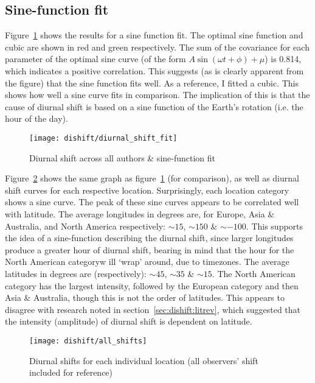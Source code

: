 \subsection{Sine-function fit}
Figure~\ref{fig:dishift:fit} shows the results for a sine function fit. The optimal sine function and cubic are shown in red and green respectively.  The sum of the covariance for each parameter of the optimal sine curve (of the form $A \sin \left( \omega t + \phi \right) + \mu$) is 0.814, which indicates a positive correlation. This suggests (as is clearly apparent from the figure) that the sine function fits well. As a reference, I fitted a cubic. This shows how well a sine curve fits in comparison. The implication of this is that the cause of diurnal shift is based on a sine function of the Earth's rotation (i.e. the hour of the day).

\begin{figure}[h!]
	\centering
	\texttt{[image: dishift/diurnal\_shift\_fit]}
	\caption{Diurnal shift across all authors \& sine-function fit
		\label{fig:dishift:fit}}
\end{figure}

Figure~\ref{fig:dishift:all} shows the same graph as figure~\ref{fig:dishift:fit} (for comparison), as well as diurnal shift curves for each respective location. Surprisingly, each location category shows a sine curve. The peak of these sine curves appears to be correlated well with latitude. The average longitudes in degrees are, for Europe, Asia \& Australia, and North America respectively: $\sim 15$, $\sim 150$ \& $\sim -100$. This supports the idea of a sine-function describing the diurnal shift, since larger longitudes produce a greater hour of diurnal shift, bearing in mind that the hour for the North American categoryw ill `wrap' around, due to timezones. The average latitudes in degrees are (respectively): $\sim 45$, $\sim 35$ \& $\sim 15$. The North American category has the largest intensity, followed by the European category and then Asia \& Australia, though this is not the order of latitudes. This appears to disagree with research noted in section~\ref{sec:dishift:litrev}, which suggested that the intensity (amplitude) of diurnal shift is dependent on latitude.  

\begin{figure}[h!]
	\centering
	\texttt{[image: dishift/all\_shifts]}
	\caption{Diurnal shifts for each individual location (all observers' shift included for reference)
		\label{fig:dishift:all}}
\end{figure}

